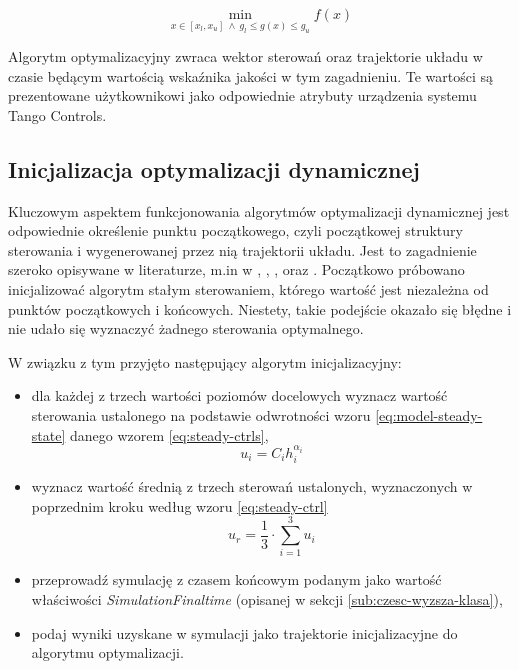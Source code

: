 \begin{equation}\label{eq:opt-stat}
    \min\limits_{x \in [x_{l}, x_{u}]~ \land~ g_{l} \leq g(x) \leq g_{u}} f(x)
\end{equation}

Algorytm optymalizacyjny zwraca wektor sterowań oraz trajektorie układu w czasie będącym wartością wskaźnika jakości w tym zagadnieniu. Te wartości są prezentowane użytkownikowi jako odpowiednie atrybuty urządzenia systemu Tango Controls.

\subsection{Inicjalizacja optymalizacji dynamicznej}
\label{sub:opt-init}

Kluczowym aspektem funkcjonowania algorytmów optymalizacji dynamicznej jest odpowiednie określenie punktu początkowego, czyli początkowej struktury sterowania i wygenerowanej przez nią trajektorii układu. Jest to zagadnienie szeroko opisywane w literaturze, m.in w \cite{Betts98}, \cite{Rao2010}, \cite{Korytowski2015}, \cite{cas+11ifac} oraz \cite{JModelicaUserGuide}.
Początkowo próbowano inicjalizować algorytm stałym sterowaniem, którego wartość jest niezależna od punktów początkowych i końcowych. Niestety, takie podejście okazało się błędne i nie udało się wyznaczyć żadnego sterowania optymalnego.

W związku z tym przyjęto następujący algorytm inicjalizacyjny:
\begin{itemize}
    \item dla każdej z trzech wartości poziomów docelowych wyznacz wartość sterowania ustalonego na podstawie odwrotności wzoru \ref{eq:model-steady-state} danego wzorem \ref{eq:steady-ctrls},
    \begin{equation} \label{eq:steady-ctrls}
    u_{i} = C_{i}h_{i}^{\alpha_{i}}
    \end{equation}
    \item wyznacz wartość średnią z trzech sterowań ustalonych, wyznaczonych w poprzednim kroku według wzoru \ref{eq:steady-ctrl}
    \begin{equation}\label{eq:steady-ctrl}
    u_{r} = \frac{1}{3} \cdot \sum_{i=1}^{3} u_{i}
    \end{equation}
    \item przeprowadź symulację z czasem końcowym podanym jako wartość właściwości \emph{SimulationFinaltime} (opisanej w sekcji \ref{sub:czesc-wyzsza-klasa}),
    \item podaj wyniki uzyskane w symulacji jako trajektorie inicjalizacyjne do algorytmu optymalizacji.
\end{itemize}

